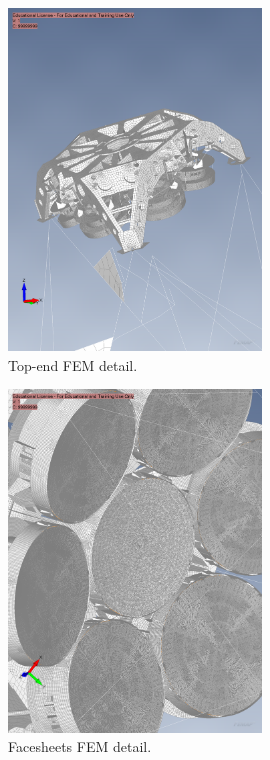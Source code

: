 \begin{figure}
  \centering
  \includegraphics[width=0.6\textwidth]{FEM/topend.png}
  \caption{Top-end FEM detail.}
  \label{fig:fem-topend}
\end{figure}

\begin{figure}
  \centering
  \includegraphics[width=0.6\textwidth]{FEM/facesheets.png}
  \caption{Facesheets FEM detail.}
  \label{fig:fem-facesheets}
\end{figure}

